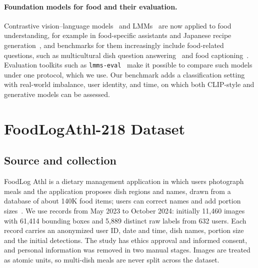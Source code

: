 \documentclass[sigconf, nonacm]{acmart}
\begin{document}
\paragraph{Foundation models for food and their evaluation.} Contrastive vision--language models~\cite{CLIP,sun2023eva} and LMMs~\cite{liu2024visual,liu2024improved,bai2023qwen,achiam2023gpt} are now applied to food understanding, for example in food-specific assistants and Japanese recipe generation~\cite{yin2023foodlmm,Imajuku2025FoodMLLM}, and benchmarks for them increasingly include food-related questions, such as multicultural dish question answering~\cite{winata2024worldcuisines} and food captioning~\cite{ma2023food}. Evaluation toolkits such as \texttt{lmms-eval}~\cite{lmms_eval2024,zhang2024lmmsevalrealitycheckevaluation} make it possible to compare such models under one protocol, which we use. Our benchmark adds a classification setting with real-world imbalance, user identity, and time, on which both CLIP-style and generative models can be assessed.



\section{FoodLogAthl-218 Dataset}
\subsection{Source and collection}
FoodLog Athl is a dietary management application in which users photograph meals and the application proposes dish regions and names, drawn from a database of about 140K food items; users can correct names and add portion sizes~\cite{nakamoto2022foodlog}. We use records from May 2023 to October 2024: initially 11,460 images with 61,414 bounding boxes and 5,889 distinct raw labels from 632 users. Each record carries an anonymized user ID, date and time, dish names, portion size and the initial detections. The study has ethics approval and informed consent, and personal information was removed in two manual stages. Images are treated as atomic units, so multi-dish meals are never split across the dataset.
\end{document}
